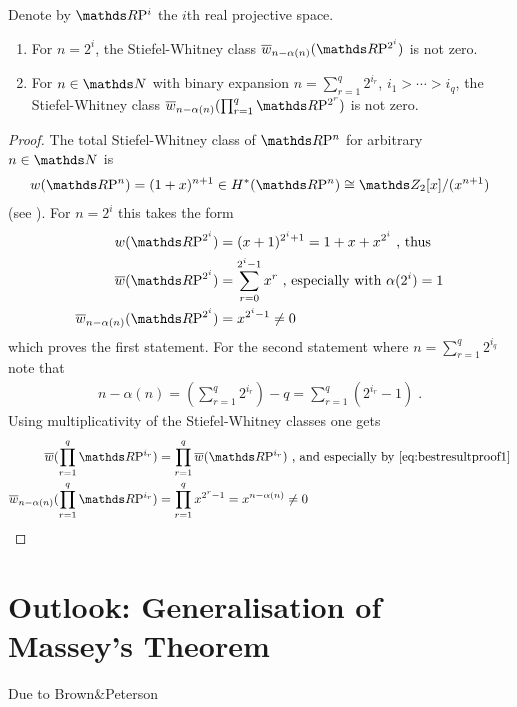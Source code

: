 \begin{Thm}
  Denote by $\RP{i}$ the $i$th real projective space.
  \begin{enumerate}
  \item For $n=2^i$, the Stiefel-Whitney class
    $\dualw{n-\alpha(n)}{\RP{2^i}}$ is not zero.
  \item For $n\in\Nat$ with binary expansion
    $n=\sum_{r=1}^{q}2^{i_r}$, $i_1>\dotsb>i_q$, the Stiefel-Whitney class
    $\dualw{n-\alpha(n)}{\prod_{r=1}^{q}\RP{2^r}}$ is not zero.
  \end{enumerate}
  \begin{proof}
    The total Stiefel-Whitney class of $\RP{n}$ for arbitrary
    $n\in\Nat$ is
    \begin{gather*}
      \W{\RP n} = (1+x)^{n+1}\in\H^*(\RP n)\cong \Zmod2[x]/(x^{n+1})
    \end{gather*}
    (see \forexample \cite[Example~(19.4.1)]{tomdieck}).
    For $n=2^i$ this takes the form
    \begin{align*}
      \W{\RP{2^i}}
      &= (x+1)^{2^i+1}
      = 1 + x + x^{2^i}
        \text{ , thus} \\
      \dualW{\RP{2^i}}
      &= \sum_{r=0}^{2^i-1} x^r
        \text{ , especially with $\alpha(2^i)=1$} \\
      \dualw{n-\alpha(n)}{\RP{2^i}}
      &= x^{2^i-1}\neq 0
    \end{align*}
    which proves the first statement.
    For the second statement where $n=\sum_{r=1}^q 2^{i_q}$ note that
    \begin{gather}\label{eq:bestresultproof1}
      n-\alpha(n)
      = \left( \sum_{r=1}^q 2^{i_r} \right) - q
      = \sum_{r=1}^q \left( 2^{i_r} - 1 \right)
      \;.
    \end{gather}
    Using multiplicativity %
    of the Stiefel-Whitney classes one gets
    \begin{align*}
      \dualW{\prod_{r=1}^q \RP{i_r}}
      &= \prod_{r=1}^q \dualW{\RP{i_r}}
        \text{ , and especially by \eqref{eq:bestresultproof1}} \\
      \dualw{n-\alpha(n)}{\prod_{r=1}^{q}\RP{i_r}}
      &= \prod_{r=1}^q x^{2^r-1}
        = x^{n-\alpha(n)} \neq 0
        \qedhere
    \end{align*}
  \end{proof}
\end{Thm}


\section{Outlook: Generalisation of Massey's Theorem} %
Due to Brown\&Peterson


